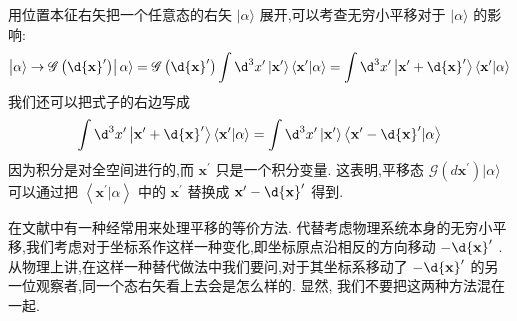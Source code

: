 	用位置本征右矢把一个任意态的右矢 $|\alpha \rangle$ 展开,可以考查无穷小平移对于 $|\alpha \rangle$ 的影响:
	\begin{equation}
		\left| {\alpha \rangle \rightarrow \mathscr{G} \left( {\d{\mathbf{x}}^{\prime }}\right) }\right| \alpha \rangle = \mathscr{G}\left( {\d{\mathbf{x}}^{\prime }}\right) \int {\d}^{3}{x}^{\prime }\left| {\mathbf{x}}^{\prime }\right\rangle \left\langle {{\mathbf{x}}^{\prime } | \alpha }\right\rangle = \int {\d}^{3}{x}^{\prime }\left| {{\mathbf{x}}^{\prime } + \d{\mathbf{x}}^{\prime }}\right\rangle \left\langle {{\mathbf{x}}^{\prime } | \alpha }\right\rangle
	\end{equation}
	我们还可以把式子的右边写成
	\begin{equation}
		\int {\d}^{3}{x}^{\prime }\left| {{\mathbf{x}}^{\prime } + \d{\mathbf{x}}^{\prime }}\right\rangle \left\langle {{\mathbf{x}}^{\prime } | \alpha }\right\rangle = \int {\d}^{3}{x}^{\prime }\left| {\mathbf{x}}^{\prime }\right\rangle \left\langle {{\mathbf{x}}^{\prime } - \d{\mathbf{x}}^{\prime } | \alpha }\right\rangle
	\end{equation}
	因为积分是对全空间进行的,而 ${\mathbf{x}}^{\prime }$ 只是一个积分变量. 这表明,平移态 $ \mathscr{G} (d{\mathbf{x}}^{\prime }) |\alpha\rangle$ 可以通过把 $\left\langle {{\mathbf{x}}^{\prime } | \alpha }\right\rangle$ 中的 ${\mathbf{x}}^{\prime }$ 替换成 ${\mathbf{x}}^{\prime } - \d{\mathbf{x}}^{\prime }$ 得到.
	
	在文献中有一种经常用来处理平移的等价方法. 代替考虑物理系统本身的无穷小平移,我们考虑对于坐标系作这样一种变化,即坐标原点沿相反的方向移动 $- \d{\mathbf{x}}^{\prime }$ . 从物理上讲,在这样一种替代做法中我们要问,对于其坐标系移动了 $- \d{\mathbf{x}}^{\prime }$ 的另一位观察者,同一个态右矢看上去会是怎么样的. 显然, 我们不要把这两种方法混在一起.
	
